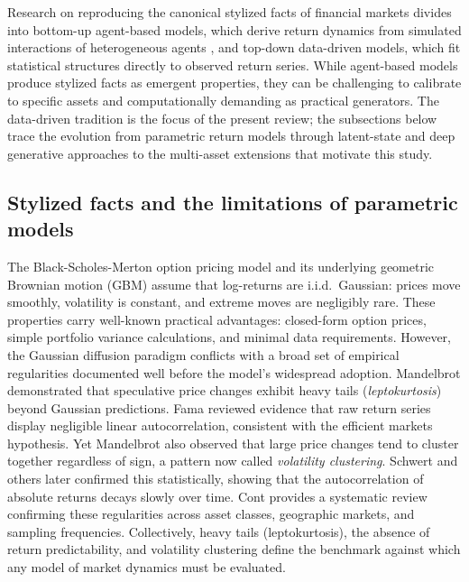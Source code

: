 Research on reproducing the canonical stylized facts of financial markets divides into bottom-up agent-based models, which derive return dynamics from simulated interactions of heterogeneous agents \cite{lux_marchesi_1999, cont_bouchaud_2000, chen_herding_2015, farmer_joshi_2002, lebaron_agent_2006, arthur_complexity_2021, farmer_quantitative_2025}, and top-down data-driven models, which fit statistical structures directly to observed return series. While agent-based models produce stylized facts as emergent properties, they can be challenging to calibrate to specific assets and computationally demanding as practical generators. The data-driven tradition is the focus of the present review; the subsections below trace the evolution from parametric return models through latent-state and deep generative approaches to the multi-asset extensions that motivate this study.

\subsection{Stylized facts and the limitations of parametric models}
The Black-Scholes-Merton option pricing model \cite{black_scholes_1973} and its underlying geometric Brownian motion (GBM) assume that log-returns are i.i.d.\ Gaussian: prices move smoothly, volatility is constant, and extreme moves are negligibly rare. These properties carry well-known practical advantages: closed-form option prices, simple portfolio variance calculations, and minimal data requirements. However, the Gaussian diffusion paradigm conflicts with a broad set of empirical regularities documented well before the model's widespread adoption. Mandelbrot \cite{mandelbrot_variation_1963} demonstrated that speculative price changes exhibit heavy tails (\textit{leptokurtosis}) beyond Gaussian predictions. Fama \cite{fama_efficient_1970} reviewed evidence that raw return series display negligible linear autocorrelation, consistent with the efficient markets hypothesis. Yet Mandelbrot also observed that large price changes tend to cluster together regardless of sign, a pattern now called \textit{volatility clustering}. Schwert \cite{schwert_why_1989} and others later confirmed this statistically, showing that the autocorrelation of absolute returns decays slowly over time. Cont \cite{cont_empirical_2001} provides a systematic review confirming these regularities across asset classes, geographic markets, and sampling frequencies. Collectively, heavy tails (leptokurtosis), the absence of return predictability, and volatility clustering define the benchmark against which any model of market dynamics must be evaluated.

